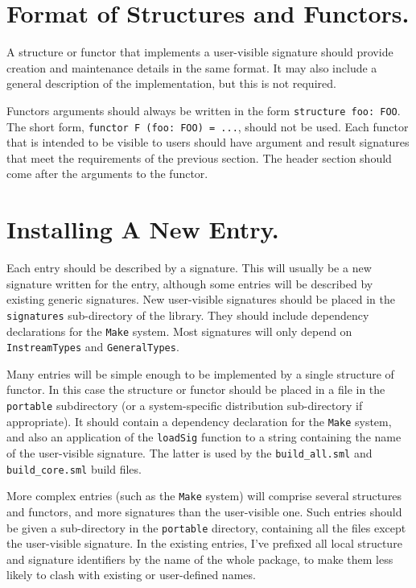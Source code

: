 \section{Format of Structures and Functors.}

A structure or functor that implements a user-visible signature should
provide creation and maintenance details in the same format.  It may also
include a general description of the implementation, but this is not
required.

Functors arguments should always be written in the form
\verb+structure foo: FOO+.  The short form, \verb+functor F (foo: FOO) = ...+,
should not be used.  Each
functor that is intended to be visible to users should have argument and
result signatures that meet the requirements of the previous section.  The
header section should come after the arguments to the functor.


\section{Installing A New Entry.}

Each entry should be described by a signature.  This will usually be a
new signature written for the entry, although some entries will be described
by existing generic signatures.  New user-visible signatures should be
placed in the {\tt signatures} sub-directory of the library.  They
should include dependency declarations for the {\tt Make} system.  Most
signatures will only depend on {\tt InstreamTypes} and {\tt GeneralTypes}.

Many entries will be simple enough to be implemented by a single structure
of functor.  In this case the structure or functor should be placed in 
a file in the {\tt portable} subdirectory (or a system-specific distribution
sub-directory if appropriate).  It should contain a dependency declaration
for the {\tt Make} system, and also an application of the {\tt loadSig}
function to a string containing the name of the user-visible signature.
The latter is used by the {\tt build\_all.sml} and {\tt build\_core.sml}
build files.

More complex entries (such as the {\tt Make} system) will comprise
several structures and functors, and more signatures than the
user-visible one.  Such entries should be given a sub-directory in
the {\tt portable} directory, containing all the files except the
user-visible signature.  In the existing entries, I've prefixed
all local structure and signature identifiers by the name of the
whole package, to make them less likely to clash with existing or
user-defined names.

